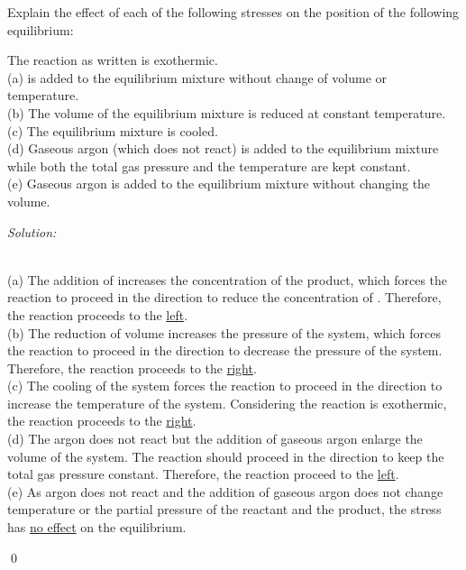 \documentclass[12pt]{article}
\newenvironment{problem}[2][Problem]{\begin{trivlist}
\item[\hskip \labelsep {\bfseries #1}\hskip \labelsep {\bfseries #2.}]}{\end{trivlist}}
\newenvironment{sol}
    {\emph{Solution:}
    }
    {
    \qed
    }
\begin{document}
\begin{problem}{14.53}
Explain the effect of each of the following stresses on the position of the following equilibrium:
\begin{center}
\end{center}
The reaction as written is exothermic.\\
(a)  is added to the equilibrium mixture without change of volume or temperature.\\
(b) The volume of the equilibrium mixture is reduced at constant temperature.\\
(c) The equilibrium mixture is cooled.\\
(d) Gaseous argon (which does not react) is added to the equilibrium mixture while both the total gas pressure and the temperature are kept constant.\\
(e) Gaseous argon is added to the equilibrium mixture without changing the volume.
\end{problem}
\begin{sol}
\\(a) The addition of  increases the concentration of the product, which forces the reaction to proceed in the direction to reduce the concentration of . Therefore, the reaction proceeds to the \uline{left}.\\
(b) The reduction of volume increases the pressure of the system, which forces the reaction to proceed in the direction to decrease the pressure of the system. Therefore, the reaction proceeds to the \uline{right}.\\
(c) The cooling of the system forces the reaction to proceed in the direction to increase the temperature of the system. Considering the reaction is exothermic, the reaction proceeds to the \uline{right}.\\
(d) The argon does not react but the addition of gaseous argon enlarge the volume of the system. The reaction should proceed in the direction to keep the total gas pressure constant. Therefore, the reaction proceed to the \uline{left}.\\
(e) As argon does not react and the addition of gaseous argon does not change temperature or the partial pressure of the reactant and the product, the stress has \uline{no effect} on the equilibrium.
\end{sol}
\end{document}
